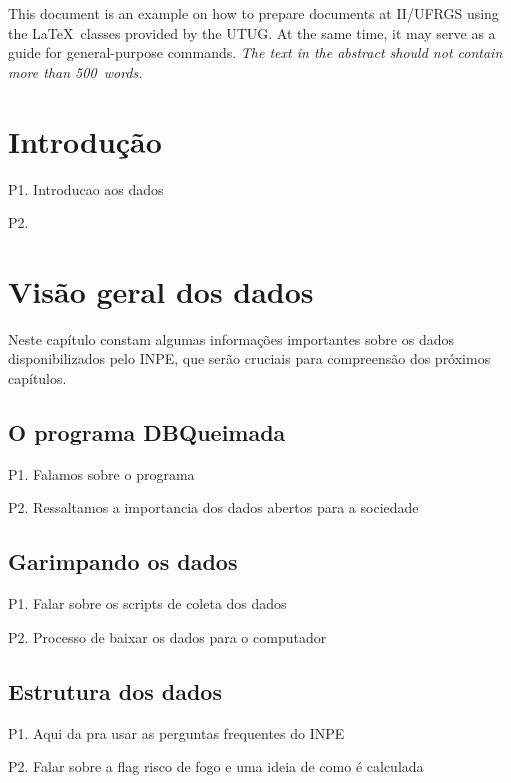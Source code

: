\documentclass[cic,tc]{iiufrgs}
\begin{document}
\begin{translatedabstract}
This document is an example on how to prepare documents at II/UFRGS
using the \LaTeX\ classes provided by the UTUG\@. At the same time, it
may serve as a guide for general-purpose commands. \emph{The text in
the abstract should not contain more than 500~words.}
\end{translatedabstract}


\chapter{Introdução}
P1. Introducao aos dados \par
P2. 


\chapter{Visão geral dos dados}

Neste capítulo constam algumas informações importantes sobre os 
dados disponibilizados pelo INPE, que serão cruciais para compreensão 
dos próximos capítulos. 

\section{O programa DBQueimada}

P1. Falamos sobre o programa \citep{setzer2019banco} \par
P2. Ressaltamos a importancia dos dados abertos para a sociedade \par

\section{Garimpando os dados}

P1. Falar sobre os scripts de coleta dos dados \par
P2. Processo de baixar os dados para o computador \par

\section{Estrutura dos dados}

P1. Aqui da pra usar as perguntas frequentes 
do INPE \citep{PerguntasFrequentesINPE} \par
P2. Falar sobre a flag risco de fogo e uma ideia de como é calculada \par
\end{document}
